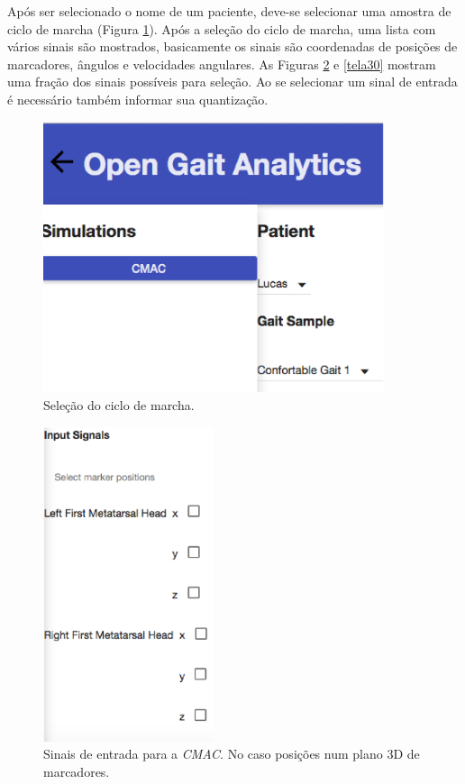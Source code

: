 Após ser selecionado o nome de um paciente, deve-se selecionar uma amostra de ciclo de marcha (Figura \ref{tela28}).
Após a seleção do ciclo de marcha, uma lista com vários sinais são mostrados, basicamente os sinais são coordenadas de posições de marcadores, ângulos e velocidades angulares. As Figuras \ref{tela29} e \ref{tela30} mostram uma fração dos sinais possíveis para seleção. Ao se selecionar um sinal de entrada é necessário também informar sua quantização.
\begin{figure}[H]
	\centering
	\includegraphics[width=10cm]{figuras/tela28.eps}
	\caption{Seleção do ciclo de marcha.}
\label{tela28}
\end{figure}

\begin{figure}[H]
	\centering
	\includegraphics[width=5cm]{figuras/tela29.eps}
	\caption{Sinais de entrada para a \emph{CMAC}. No caso posições num plano 3D de marcadores.}
\label{tela29}
\end{figure}

